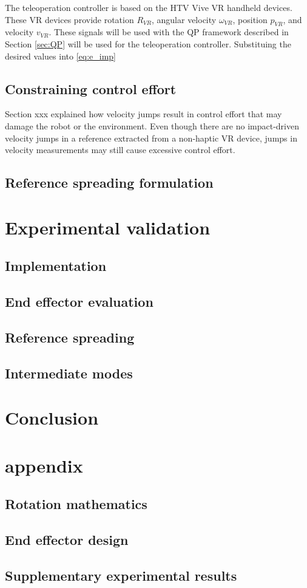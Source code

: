 \documentclass[a4paper, 10pt, conference]{ieeeconf}
\begin{document}
    The teleoperation controller is based on the HTV Vive VR handheld devices. These VR devices provide rotation $R_{VR}$, angular velocity $\omega_{VR}$, position $p_{VR}$, and velocity $v_{VR}$. These signals will be used with the QP framework described in Section \ref{sec:QP} will be used for the teleoperation controller. Substituing the desired values into \ref{eq:e_imp}

    \subsection{Constraining control effort}
    Section xxx explained how velocity jumps result in control effort that may damage the robot or the environment. Even though there are no impact-driven velocity jumps in a reference extracted from a non-haptic VR device, jumps in velocity measurements may still cause excessive control effort. 

    \subsection{Reference spreading formulation}

    \section{Experimental validation}
    \subsection{Implementation}
    \subsection{End effector evaluation}
    \subsection{Reference spreading}
    \subsection{Intermediate modes}

    \section{Conclusion}
    
\clearpage
\section*{appendix}
\subsection{Rotation mathematics}
\subsection{End effector design}
\subsection{Supplementary experimental results}
\end{document}
